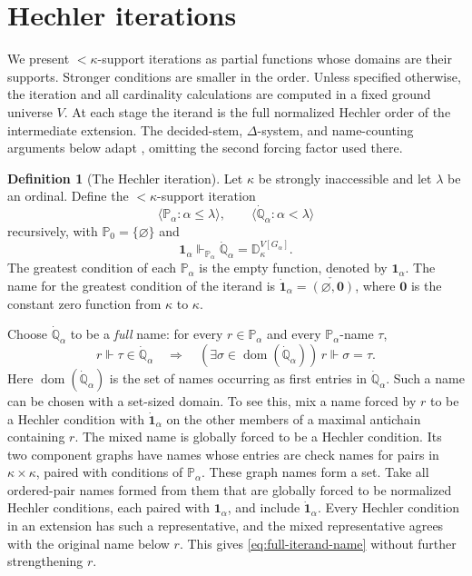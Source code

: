 \documentclass[11pt,a4paper]{amsart}
\theoremstyle{definition}
\newtheorem{definition}[theorem]{Definition}
\theoremstyle{remark}
\newcommand{\D}{\mathbb D}
\newcommand{\PP}{\mathbb P}
\DeclareMathOperator{\dom}{dom}
\begin{document}
\section{Hechler iterations}
\label{sec:iteration}

We present \(<\kappa\)-support iterations as partial functions
whose domains are their supports. Stronger conditions are smaller
in the order. Unless specified otherwise, the iteration and all
cardinality calculations are computed in a fixed ground universe
\(V\). At each stage the iterand is the full normalized Hechler
order of the intermediate extension. The decided-stem,
\(\Delta\)-system, and name-counting arguments below adapt
\cite[Lemma 3.10]{Schuerz}, omitting the second forcing factor
used there.

\begin{definition}[The Hechler iteration]\label{def:iteration}
Let \(\kappa\) be strongly inaccessible and let \(\lambda\) be
an ordinal. Define the \(<\kappa\)-support iteration
\[
 \langle\PP_\alpha:\alpha\leq\lambda\rangle,
 \qquad\langle\dot{\mathbb Q}_\alpha:\alpha<\lambda\rangle
\]
recursively, with \(\PP_0=\{\varnothing\}\) and
\[
 \mathbf1_\alpha\Vdash_{\PP_\alpha}
 \dot{\mathbb Q}_\alpha=\D_\kappa^{V[G_\alpha]}.
\]
The greatest condition of each \(\PP_\alpha\) is the empty
function, denoted by \(\mathbf1_\alpha\). The name for the
greatest condition of the iterand is
\(\dot{\mathbf1}_\alpha=\check{(\varnothing,\mathbf0)}\),
where \(\mathbf0\) is the constant zero function from
\(\kappa\) to \(\kappa\).

Choose \(\dot{\mathbb Q}_\alpha\) to be a \emph{full} name:
for every \(r\in\PP_\alpha\) and every
\(\PP_\alpha\)-name \(\tau\),
\begin{equation}\label{eq:full-iterand-name}
 r\Vdash\tau\in\dot{\mathbb Q}_\alpha
 \quad\Longrightarrow\quad
 (\exists\sigma\in\dom(\dot{\mathbb Q}_\alpha))\,
                         r\Vdash\sigma=\tau.
\end{equation}
Here \(\dom(\dot{\mathbb Q}_\alpha)\) is the set of names
occurring as first entries in \(\dot{\mathbb Q}_\alpha\).
Such a name can be chosen with a set-sized domain. To see this,
mix a name forced by \(r\) to be a Hechler condition with
\(\dot{\mathbf1}_\alpha\) on the other members of a maximal
antichain containing \(r\). The mixed name is globally forced
to be a Hechler condition. Its two component graphs have names
whose entries are check names for pairs in \(\kappa\times\kappa\),
paired with conditions of \(\PP_\alpha\). These graph names form
a set. Take all ordered-pair names formed from them that are
globally forced to be normalized Hechler conditions, each paired
with \(\mathbf1_\alpha\), and include
\(\dot{\mathbf1}_\alpha\). Every Hechler condition in an extension
has such a representative, and the mixed representative agrees
with the original name below \(r\). This gives
\eqref{eq:full-iterand-name} without further strengthening \(r\).


\end{definition}
\end{document}
